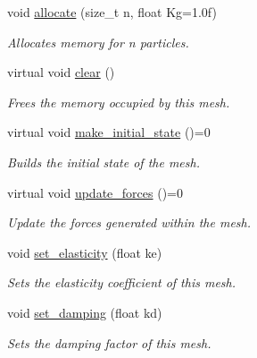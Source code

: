 \begin{DoxyCompactItemize}
void \hyperlink{classphysim_1_1meshes_1_1mesh_a09dcfcda6da092c7acae3f961fde4b32}{allocate} (size\+\_\+t n, float Kg=1.\+0f)
\begin{DoxyCompactList}\small\item\em Allocates memory for {\itshape n} particles. \end{DoxyCompactList}\item 
\mbox{\label{classphysim_1_1meshes_1_1mesh_ae2923846bfeec345fae4876181960c03}} 
virtual void \hyperlink{classphysim_1_1meshes_1_1mesh_ae2923846bfeec345fae4876181960c03}{clear} ()
\begin{DoxyCompactList}\small\item\em Frees the memory occupied by this mesh. \end{DoxyCompactList}\item 
virtual void \hyperlink{classphysim_1_1meshes_1_1mesh_a62f877dd42bc306ef70c76fc172f245f}{make\+\_\+initial\+\_\+state} ()=0
\begin{DoxyCompactList}\small\item\em Builds the initial state of the mesh. \end{DoxyCompactList}\item 
virtual void \hyperlink{classphysim_1_1meshes_1_1mesh_ad7cad4cd454cce562c8c404ef09f8bd3}{update\+\_\+forces} ()=0
\begin{DoxyCompactList}\small\item\em Update the forces generated within the mesh. \end{DoxyCompactList}\item 
\mbox{\label{classphysim_1_1meshes_1_1mesh_a1b12b241f860fea09d17196132cf46da}} 
void \hyperlink{classphysim_1_1meshes_1_1mesh_a1b12b241f860fea09d17196132cf46da}{set\+\_\+elasticity} (float ke)
\begin{DoxyCompactList}\small\item\em Sets the elasticity coefficient of this mesh. \end{DoxyCompactList}\item 
\mbox{\label{classphysim_1_1meshes_1_1mesh_a54b38e38d22ba1e4b4966c29e0fcb3ea}} 
void \hyperlink{classphysim_1_1meshes_1_1mesh_a54b38e38d22ba1e4b4966c29e0fcb3ea}{set\+\_\+damping} (float kd)
\begin{DoxyCompactList}\small\item\em Sets the damping factor of this mesh. \end{DoxyCompactList}\item 

\end{DoxyCompactItemize}
